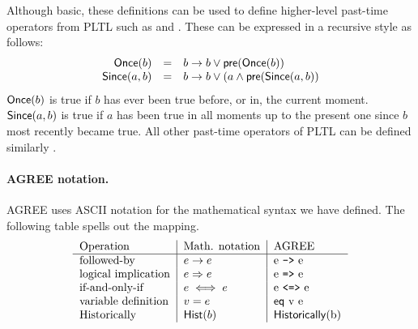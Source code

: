 Although basic, these definitions can be used to define higher-level
past-time operators from PLTL such as  and .
These can be expressed in a recursive style as follows:
\[
\begin{array}{rcl}
\mathsf{Once}(b) & = & b \to b \vee \mathsf{pre}(\mathsf{Once}(b)) \\
\mathsf{Since}(a, b) & = & b \to b \lor (a \land \mathsf{pre}(\mathsf{Since}(a, b))
\end{array}
\]
\noindent $\mathsf{Once}(b)$ is true if $b$ has ever been true before, or in, the
current moment.  $\mathsf{Since}(a, b)$ is true if $a$ has been true in
all moments up to the present one since $b$ most recently became true.
All other past-time operators of PLTL can be defined similarly \cite{monitor}.

\paragraph{AGREE notation.}
AGREE uses ASCII notation for the mathematical syntax we have
defined. The following table spells out the mapping.
\[
\begin{tabular}{l|l|l}
 Operation & Math. notation & AGREE \\ \hline
 followed-by &  $e \to e$          & e \verb+->+ e  \\
 logical implication &  $e \imp e$ & e \verb+=>+ e \\
 if-and-only-if &  $e \iff e$      & e \verb+<=>+ e \\
 variable definition & $v = e$     & \konst{eq} v\ e \\
 Historically  & $\konst{Hist}(b)$ & \konst{Historically}(b) \\
\end{tabular}
\]
